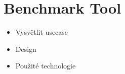 \chapter{Benchmark Tool}
    \begin{itemize}
        \item Vysvětlit usecase
        \item Design 
        \item Použité technologie
    \end{itemize}